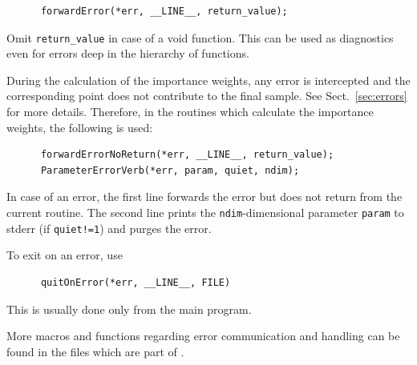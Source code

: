 \documentclass[11pt, chapterprefix, headsepline]{scrartcl}
\begin{document}
\begin{verbatim}
      forwardError(*err, __LINE__, return_value);
\end{verbatim}

Omit \texttt{return\_value} in case of a void function. This can be used as
diagnostics even for errors deep in the hierarchy of functions.

During the calculation of the importance weights, any error is
intercepted and the corresponding point does not contribute to the
final sample. See Sect.~\ref{sec:errors} for more details. Therefore,
in the routines which calculate the importance weights, the following
is used:

\begin{verbatim}
      forwardErrorNoReturn(*err, __LINE__, return_value);
      ParameterErrorVerb(*err, param, quiet, ndim);
\end{verbatim}

In case of an error, the first line forwards the error but does not return from the current
routine. The second line prints the \texttt{ndim}-dimensional parameter \texttt{param}
to stderr (if \texttt{quiet!=1}) and purges the error.


To exit on an error, use%
%
\begin{verbatim}
      quitOnError(*err, __LINE__, FILE)
\end{verbatim}
%
This is usually done only from the main program.

More macros and functions regarding error communication and handling
can be found in the files  which are
part of \pmclib.









\end{document}

